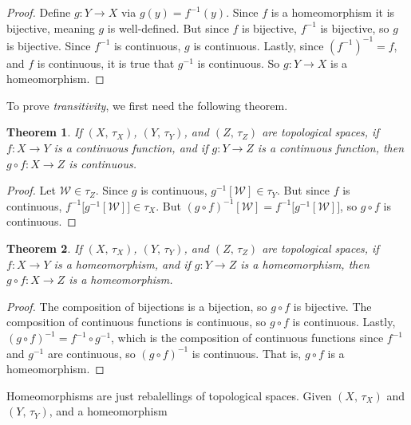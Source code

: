 \documentclass{article}
\theoremstyle{plain}
\newtheorem{theorem}{Theorem}[section]
\theoremstyle{normal}
\begin{document}
        \begin{proof}
            Define $g:Y\rightarrow{X}$ via $g(y)=f^{-1}(y)$. Since $f$ is a
            homeomorphism it is bijective, meaning $g$ is well-defined. But
            since $f$ is bijective, $f^{-1}$ is bijective, so $g$ is bijective.
            Since $f^{-1}$ is continuous, $g$ is continuous. Lastly, since
            $(f^{-1})^{-1}=f$, and $f$ is continuous, it is true that
            $g^{-1}$ is continuous. So $g:Y\rightarrow{X}$ is a homeomorphism.
        \end{proof}
        To prove \textit{transitivity}, we first need the following theorem.
        \begin{theorem}
            If $(X,\,\tau_{X})$, $(Y,\,\tau_{Y})$, and $(Z,\,\tau_{Z})$ are
            topological spaces, if $f:X\rightarrow{Y}$ is a continuous
            function, and if $g:Y\rightarrow{Z}$ is a continuous function,
            then $g\circ{f}:X\rightarrow{Z}$ is continuous.
        \end{theorem}
        \begin{proof}
            Let $\mathcal{W}\in\tau_{Z}$. Since $g$ is continuous,
            $g^{-1}[\mathcal{W}]\in\tau_{Y}$. But since $f$ is continuous,
            $f^{-1}\big[g^{-1}[\mathcal{W}]\big]\in\tau_{X}$. But
            $(g\circ{f})^{-1}[\mathcal{W}]=f^{-1}\big[g^{-1}[\mathcal{W}]\big]$,
            so $g\circ{f}$ is continuous.
        \end{proof}
        \begin{theorem}
            If $(X,\,\tau_{X})$, $(Y,\,\tau_{Y})$, and $(Z,\,\tau_{Z})$ are
            topological spaces, if $f:X\rightarrow{Y}$ is a homeomorphism, and
            if $g:Y\rightarrow{Z}$ is a homeomorphism, then
            $g\circ{f}:X\rightarrow{Z}$ is a homeomorphism.
        \end{theorem}
        \begin{proof}
            The composition of bijections is a bijection, so $g\circ{f}$ is
            bijective. The composition of continuous functions is continuous,
            so $g\circ{f}$ is continuous. Lastly,
            $(g\circ{f})^{-1}=f^{-1}\circ{g}^{-1}$, which is the composition of
            continuous functions since $f^{-1}$ and $g^{-1}$ are continuous,
            so $(g\circ{f})^{-1}$ is continuous. That is, $g\circ{f}$ is a
            homeomorphism.
        \end{proof}
        Homeomorphisms are just rebalellings of topological spaces.
        Given $(X,\,\tau_{X})$ and $(Y,\,\tau_{Y})$, and a homeomorphism
\end{document}
